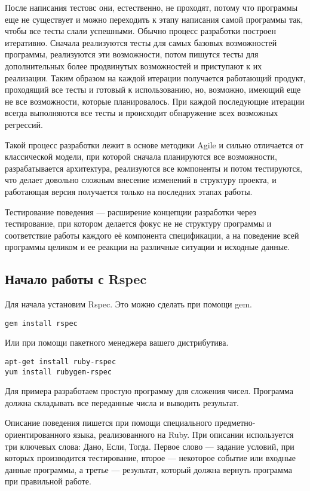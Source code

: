 После написания тестовс они, естественно, не проходят, потому что программы еще не существует и можно переходить к этапу написания самой программы так, чтобы все тесты слали успешными. Обычно процесс разработки построен итеративно. Сначала реализуются тесты для самых базовых возможностей программы, реализуются эти возможности, потом пишутся тесты для дополнительных более продвинутых возможностей и приступают к их реализации. Таким образом на каждой итерации получается работающий продукт, проходящий все тесты и готовый к использованию, но, возможно, имеющий еще не все возможности, которые планировалось. При каждой последующие итерации всегда выполняются все тесты и происходит обнаружение всех возможных регрессий.

Такой процесс разработки лежит в основе методики Agile и сильно отличается от классической модели, при которой сначала планируются все возможности, разрабатывается архитектура, реализуются все компоненты и потом тестируются, что делает довольно сложным внесение изменений в структуру проекта, и работающая версия получается только на последних этапах работы.

Тестирование поведения --- расширение концепции разработки через тестирование, при котором делается фокус не не структуру программы и соответствие работы каждого её компонента спецификации, а на поведение всей программы целиком и ее реакции на различные ситуации и исходные данные.

\subsection{Начало работы с Rspec}

Для начала установим Rspec. Это можно сделать при помощи gem.

\begin{verbatim}
gem install rspec
\end{verbatim}

Или при помощи пакетного менеджера вашего дистрибутива.

\begin{verbatim}
apt-get install ruby-rspec
yum install rubygem-rspec
\end{verbatim}

Для примера разработаем простую программу для сложения чисел. Программа должна складывать все переданные числа и выводить результат.

Описание поведения пишется при помощи специального предметно-ориентированного языка, реализованного на Ruby. При описании используется три ключевых слова: Дано, Если, Тогда. Первое слово --- задание условий, при которых производится тестирование, второе --- некоторое событие или входные данные программы, а третье --- результат, который должна вернуть программа при правильной работе.

